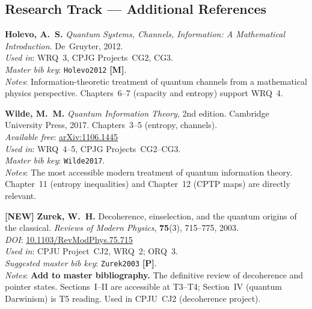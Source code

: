 \documentclass[11pt,a4paper]{article}
\begin{document}
\subsection*{Research Track --- Additional References}

\begin{enumerate}[leftmargin=2em, label={\textbf{[\arabic*]}}, itemsep=10pt, resume]

\item
  \textbf{Holevo, A.~S.}
  \textit{Quantum Systems, Channels, Information: A Mathematical Introduction}.
  De~Gruyter, 2012.\\
  \textit{Used in}: WRQ~3, CPJG Projects~CG2, CG3.\\
  \textit{Master bib key}: \texttt{Holevo2012} \textbf{[M]}.\\
  \textit{Notes}: Information-theoretic treatment of quantum channels from a
  mathematical physics perspective. Chapters~6--7 (capacity and entropy) support WRQ~4.

\item
  \textbf{Wilde, M.~M.}
  \textit{Quantum Information Theory}, 2nd edition.
  Cambridge University Press, 2017. Chapters~3--5 (entropy, channels).\\
  \textit{Available free}: \href{https://arxiv.org/abs/1106.1445}{arXiv:1106.1445}\\
  \textit{Used in}: WRQ~4--5, CPJG Projects~CG2--CG3.\\
  \textit{Master bib key}: \texttt{Wilde2017}.\\
  \textit{Notes}: The most accessible modern treatment of quantum information theory.
  Chapter~11 (entropy inequalities) and Chapter~12 (CPTP maps) are directly relevant.

\item \textbf{[NEW]}
  \textbf{Zurek, W.~H.}
  Decoherence, einselection, and the quantum origins of the classical.
  \textit{Reviews of Modern Physics}, \textbf{75}(3), 715--775, 2003.\\
  \textit{DOI}: \href{https://doi.org/10.1103/RevModPhys.75.715}{10.1103/RevModPhys.75.715}\\
  \textit{Used in}: CPJU Project~CJ2, WRQ~2; ORQ~3.\\
  \textit{Suggested master bib key}: \texttt{Zurek2003} \textbf{[P]}.\\
  \textit{Notes}: \textbf{Add to master bibliography.} The definitive review of
  decoherence and pointer states. Sections~I--II are accessible at T3--T4;
  Section~IV (quantum Darwinism) is T5 reading. Used in CPJU~CJ2 (decoherence project).


\end{enumerate}
\end{document}
